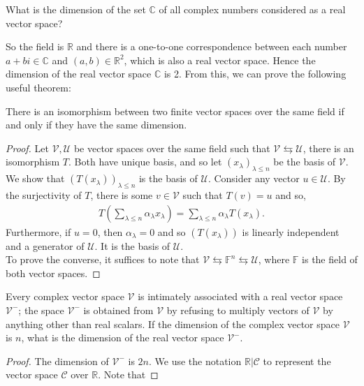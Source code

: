 \documentclass[12pt]{article}
\newenvironment{theorem}[2][Theorem]{\begin{trivlist} \item[\hskip \labelsep {\bfseries #1}\hskip \labelsep {\bfseries #2.}]}{\end{trivlist}}
\newenvironment{problem}[2][Problem]{\begin{trivlist} \item[\hskip \labelsep {\bfseries #1}\hskip \labelsep {\bfseries #2.}]}{\end{trivlist}}
\newenvironment{solution}[1][Solution]{\begin{trivlist} \item[\hskip \labelsep {\bfseries #1}]}{\end{trivlist}}
\begin{document}
\begin{problem}{1}
\begin{enumerate}
  \item What is the dimension of the set $\mathbb{C}$ of all complex numbers considered as a real vector space? 
\begin{solution}
  So the field is $\mathbb{R}$ and there is a one-to-one correspondence between each number $a+bi\in \mathbb{C}$ and $(a,b)\in \mathbb{R}^{2}$, which is also a real vector space. Hence the dimension of the real vector space $\mathbb{C}$ is 2. From this, we can prove the following useful theorem:
  \begin{theorem}{Isomorphism-dimension:}
    There is an isomorphism between two finite vector spaces over the same field if and only if they have the same dimension.
\begin{proof}
  Let $\mathcal{V},\mathcal{U}$ be vector spaces over the same field such that $\mathcal{V}\leftrightarrows \mathcal{U}$, there is an isomorphism $T$.  Both have unique basis, and so let $(x_{\lambda})_{\lambda\leq n}$ be the basis of $\mathcal{V}$. We show that $(T(x_{\lambda}))_{\lambda\leq n}$ is the basis of $\mathcal{U}$. Consider any vector $u\in \mathcal{U}$. By the surjectivity of $T$, there is some $v\in \mathcal{V}$ such that $T(v) = u$ and so, 
\begin{align*}
  T(\sum_{\lambda\leq n} \alpha_{\lambda}x_{\lambda}) = \sum_{\lambda\leq n}\alpha_{\lambda} T(x_{\lambda}). 
\end{align*}
Furthermore, if $u=0$, then $\alpha_{\lambda} = 0$ and so $(T(x_{\lambda}))$ is linearly independent and a generator of $\mathcal{U}$. It is the basis of $\mathcal{U}$. \\
To prove the converse, it suffices to note that $\mathcal{V}\leftrightarrows \mathbb{F}^{n}\leftrightarrows \mathcal{U}$, where $\mathbb{F}$ is the field of both vector spaces.
\end{proof}
\end{theorem}
\item Every complex vector space $\mathcal{V}$ is intimately associated with a real vector space $\mathcal{V}^{-}$; the space $\mathcal{V}^{-}$ is obtained from $\mathcal{V}$ by refusing to multiply vectors of $\mathcal{V}$ by anything other than real scalars. If the dimension of the complex vector space $\mathcal{V}$ is $n$, what is the dimension of the real vector space $\mathcal{V}^{-}$.
\begin{proof}
  The dimension of $\mathcal{V}^{-}$ is $2n$. We use the notation $\mathbb{R}|\mathcal{C}$ to represent the vector space $\mathcal{C}$ over $\mathbb{R}$. Note that 

\end{proof}
\end{solution}
\end{enumerate}
\end{problem}
\end{document}
